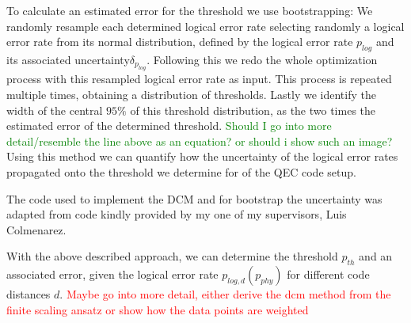 To calculate an estimated error for the threshold we use bootstrapping:
We randomly resample each determined logical error rate selecting randomly a logical error rate from its normal distribution, defined by the logical error rate $p_{log}$ and its associated uncertainty$\delta_{p_{log}}$.
Following this we redo the whole optimization process with this resampled logical error rate as input.
This process is repeated multiple times, obtaining a distribution of thresholds.
Lastly we identify the width of the central $95\%$ of this threshold distribution, as the two times the estimated error of the determined threshold.
\textcolor{green}{Should I go into more detail/resemble the line above as an equation? or should i show such an image?}
Using this method we can quantify how the uncertainty of the logical error rates propagated onto the threshold we determine for of the QEC code setup. 

The code used to implement the DCM and for bootstrap the uncertainty was adapted from code kindly provided by my one of my supervisors, Luis Colmenarez.

With the above described approach, we can determine the threshold $p_{th}$ and an associated error, given the logical error rate $p_{log,d}(p_{phy})$ for different code distances $d$.
\textcolor{red}{Maybe go into more detail, either derive the dcm method from the finite scaling ansatz or show how the data points are weighted}





